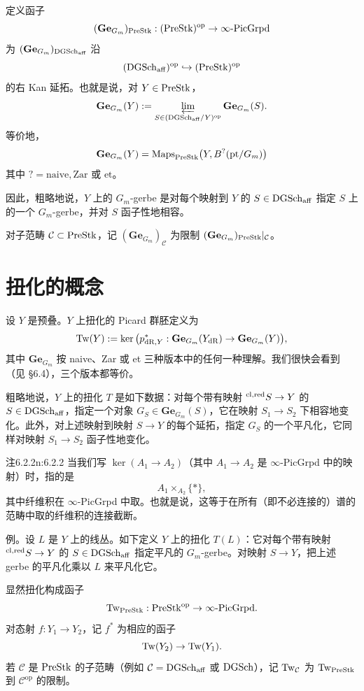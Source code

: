 定义函子
\[
(\mathbf{Ge}_{G_m})_{\mathrm{PreStk}}:(\mathrm{PreStk})^{\mathrm{op}}\to\infty\text{-}\mathrm{PicGrpd}
\]
为 $(\mathbf{Ge}_{G_m})_{\mathrm{DGSch}_{\mathrm{aff}}}$ 沿
\[
(\mathrm{DGSch}_{\mathrm{aff}})^{\mathrm{op}}\hookrightarrow(\mathrm{PreStk})^{\mathrm{op}}
\]
的右 Kan 延拓。也就是说，对 $Y\in\mathrm{PreStk}$，
\[
\mathbf{Ge}_{G_m}(Y):=\varprojlim_{S\in(\mathrm{DGSch}_{\mathrm{aff}}/Y)^{\mathrm{op}}}\mathbf{Ge}_{G_m}(S).
\]
等价地，
\[
\mathbf{Ge}_{G_m}(Y)=\mathrm{Maps}_{\mathrm{PreStk}}\big(Y,B^{?}(\mathrm{pt}/G_m)\big)
\]
其中 $?=\mathrm{naive},\mathrm{Zar}$ 或 $\mathrm{et}$。

因此，粗略地说，$Y$ 上的 $G_m$-gerbe 是对每个映射到 $Y$ 的 $S\in\mathrm{DGSch}_{\mathrm{aff}}$ 指定 $S$ 上的一个 $G_m$-gerbe，并对 $S$ 函子性地相容。

对子范畴 $\mathcal{C}\subset\mathrm{PreStk}$，记 $(\mathbf{Ge}_{G_m})_{\mathcal{C}}$ 为限制 $(\mathbf{Ge}_{G_m})_{\mathrm{PreStk}}|_{\mathcal{C}}$。

\section{扭化的概念}

设 $Y$ 是预叠。$Y$ 上扭化的 Picard 群胚定义为
\[
\mathrm{Tw}(Y):=\ker\big(p^*_{\mathrm{dR},Y}:\mathbf{Ge}_{G_m}(Y_{\mathrm{dR}})\to\mathbf{Ge}_{G_m}(Y)\big),
\]
其中 $\mathbf{Ge}_{G_m}$ 按 naive、Zar 或 et 三种版本中的任何一种理解。我们很快会看到（见 §6.4），三个版本都等价。

粗略地说，$Y$ 上的扭化 $T$ 是如下数据：对每个带有映射 $^{\mathrm{cl,red}} S\to Y$ 的 $S\in\mathrm{DGSch}_{\mathrm{aff}}$，指定一个对象 $G_S\in\mathbf{Ge}_{G_m}(S)$，它在映射 $S_1\to S_2$ 下相容地变化。此外，对上述映射到映射 $S\to Y$ 的每个延拓，指定 $G_S$ 的一个平凡化，它同样对映射 $S_1\to S_2$ 函子性地变化。

\begin{othm}{注}{6.2.2}{n:6.2.2}
当我们写 $\ker(A_1\to A_2)$（其中 $A_1\to A_2$ 是 $\infty$-PicGrpd 中的映射）时，指的是
\[
A_1\times_{A_2}\{*\},
\]
其中纤维积在 $\infty$-PicGrpd 中取。也就是说，这等于在所有（即不必连接的）谱的范畴中取的纤维积的连接截断。
\end{othm}

例。设 $L$ 是 $Y$ 上的线丛。如下定义 $Y$ 上的扭化 $T(L)$：它对每个带有映射 $^{\mathrm{cl,red}} S\to Y$ 的 $S\in\mathrm{DGSch}_{\mathrm{aff}}$ 指定平凡的 $G_m$-gerbe。对映射 $S\to Y$，把上述 gerbe 的平凡化乘以 $L$ 来平凡化它。

显然扭化构成函子
\[
\mathrm{Tw}_{\mathrm{PreStk}}:\mathrm{PreStk}^{\mathrm{op}}\to\infty\text{-}\mathrm{PicGrpd}.
\]
对态射 $f:Y_1\to Y_2$，记 $f^*$ 为相应的函子
\[
\mathrm{Tw}(Y_2)\to\mathrm{Tw}(Y_1).
\]
若 $\mathcal{C}$ 是 $\mathrm{PreStk}$ 的子范畴（例如 $\mathcal{C}=\mathrm{DGSch}_{\mathrm{aff}}$ 或 $\mathrm{DGSch}$），记 $\mathrm{Tw}_{\mathcal{C}}$ 为 $\mathrm{Tw}_{\mathrm{PreStk}}$ 到 $\mathcal{C}^{\mathrm{op}}$ 的限制。

